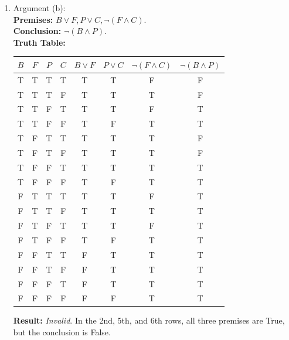 \begin{enumerate}
\begin{enumerate}
  \item Argument (b): \\
    \textbf{Premises:} $B \lor F, P \lor C, \neg(F \land C)$. \\
    \textbf{Conclusion:} $\neg(B \land P)$. \\
    \textbf{Truth Table:}
    \begin{center}
      \begin{tabular}{cccccccc}
        $B$ & $F$ & $P$ & $C$ & $B \lor F$ & $P \lor C$ & $\neg(F \land C)$ & $\neg(B \land P)$ \\
        \midrule
        T & T & T & T & T & T & F & F \\
        T & T & T & F & T & T & T & F \\
        T & T & F & T & T & T & F & T \\
        T & T & F & F & T & F & T & T \\
        T & F & T & T & T & T & T & F \\
        T & F & T & F & T & T & T & F \\
        T & F & F & T & T & T & T & T \\
        T & F & F & F & T & F & T & T \\
        F & T & T & T & T & T & F & T \\
        F & T & T & F & T & T & T & T \\
        F & T & F & T & T & T & F & T \\
        F & T & F & F & T & F & T & T \\
        F & F & T & T & F & T & T & T \\
        F & F & T & F & F & T & T & T \\
        F & F & F & T & F & T & T & T \\
        F & F & F & F & F & F & T & T 
      \end{tabular}
    \end{center}
    \textbf{Result:} \emph{Invalid}. In the 2nd, 5th, and 6th rows, all three premises are True, but the conclusion is False.


\end{enumerate}
\end{enumerate}
